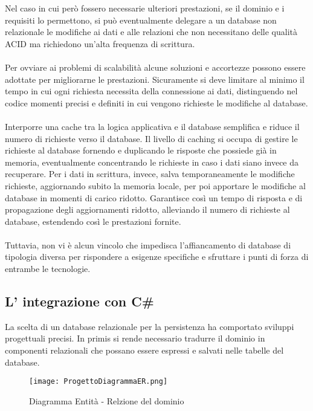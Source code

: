 Nel caso in cui però fossero necessarie ulteriori prestazioni, 
se il dominio e i requisiti lo permettono, 
si può eventualmente delegare a un database non relazionale le modifiche ai dati e alle relazioni 
che non necessitano delle qualità ACID ma richiedono un’alta frequenza di scrittura.\\
\\ 
Per ovviare ai problemi di scalabilità alcune soluzioni e accortezze
possono essere adottate per migliorarne le prestazioni. 
Sicuramente si deve limitare al minimo il tempo in cui ogni richiesta necessita della connessione ai dati, 
distinguendo nel codice momenti precisi e definiti in cui vengono richieste le modifiche al database. \\
\\  
Interporre una cache tra la logica applicativa e il database
semplifica e riduce il numero di richieste verso il database. 
Il livello di caching si occupa di gestire le richieste al database 
fornendo e duplicando le risposte che possiede già in memoria, 
eventualmente concentrando le richieste in caso i dati siano invece da recuperare. 
Per i dati in scrittura, invece, salva temporaneamente le modifiche richieste, 
aggiornando subito la memoria locale, 
per poi apportare le modifiche al database in momenti di carico ridotto. 
Garantisce così un tempo di risposta e di propagazione degli aggiornamenti ridotto,
alleviando il numero di richieste al database, estendendo così  le prestazioni fornite.\\
\\


Tuttavia, non vi è alcun vincolo che impedisca l'affiancamento di database di tipologia diversa 
per rispondere a esigenze specifiche e sfruttare i punti di forza di entrambe le tecnologie.
\\


\subsection{L' integrazione con C\#}

La scelta di un database relazionale per la persistenza ha comportato sviluppi progettuali precisi. 
In primis si rende necessario tradurre il dominio in componenti relazionali che possano essere espressi e salvati nelle tabelle del database.

\begin{figure}[h!]
    \centering
    \texttt{[image: ProgettoDiagrammaER.png]}
    \caption{Diagramma Entità - Relzione del dominio}
\end{figure}	

